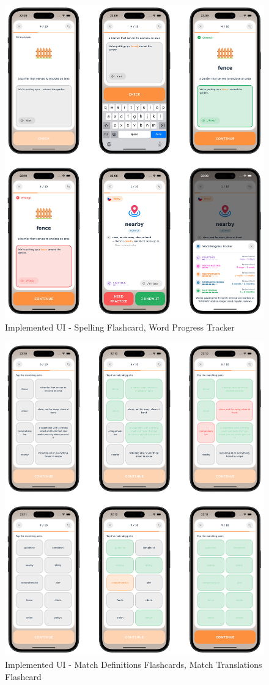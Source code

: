 \begin{figure}[!h]
    \includegraphics[width=1.0\textwidth]{src/figures/implementation-2.png}
    \caption{Implemented UI - Spelling Flashcard, Word Progress Tracker}
    \label{fig:implementation-2}
\end{figure}

\begin{figure}[!h]
    \includegraphics[width=1.0\textwidth]{src/figures/implementation-3.png}
    \caption{Implemented UI - Match Definitions Flashcards, Match Translations Flashcard}
    \label{fig:implementation-3}
\end{figure}